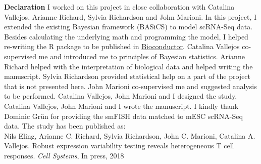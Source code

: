 \begin{Comment}
\textbf{Declaration} I worked on this project in close collaboration with Catalina Vallejos, Arianne Richard, Sylvia Richardson and John Marioni. In this project, I extended the existing Bayesian framework (BASiCS) to model scRNA-Seq data. Besides calculating the underlying math and programming the model, I helped re-writing the R package to be published in \href{https://bioconductor.org/packages/release/bioc/html/BASiCS.html}{Bioconductor}. Catalina Vallejos co-supervised me and introduced me to principles of Bayesian statistics. Arianne Richard helped with the interpretation of biological data and helped writing the manuscript. Sylvia Richardson provided statistical help on a part of the project that is not presented here. John Marioni co-supervised me and suggested analysis to be performed. Catalina Vallejos, John Marioni and I designed the study. Catalina Vallejos, John Marioni and I wrote the manuscript. I kindly thank Dominic Gr\"un for providing the smFISH data matched to mESC scRNA-Seq data. The study has been published as:\\

Nils Eling, Arianne C. Richard, Sylvia Richardson, John C. Marioni, Catalina A. Vallejos. Robust expression variability testing reveals heterogeneous T cell responses. \emph{Cell Systems}, In press, 2018 
\end{Comment}

\vspace*{\fill}

\newpage


\newpage

\newpage


